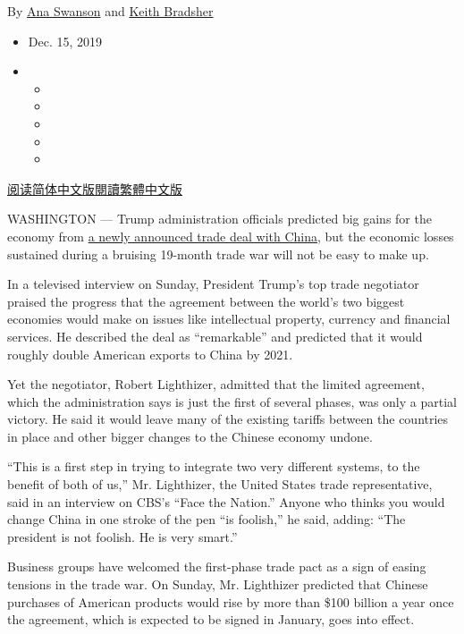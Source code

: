 By \href{https://www.nytimes.com/by/ana-swanson}{Ana Swanson} and
\href{https://www.nytimes.com/by/keith-bradsher}{Keith Bradsher}

\begin{itemize}
\item
  Dec. 15, 2019
\item
  \begin{itemize}
  \item
  \item
  \item
  \item
  \item
  \end{itemize}
\end{itemize}

\href{https://cn.nytimes.com/business/20191216/us-china-trade-deal/}{阅读简体中文版}\href{https://cn.nytimes.com/business/20191216/us-china-trade-deal/zh-hant/}{閱讀繁體中文版}

WASHINGTON --- Trump administration officials predicted big gains for
the economy from
\href{https://www.nytimes.com/2019/12/13/business/economy/china-trade-deal.html}{a
newly announced trade deal with China}, but the economic losses
sustained during a bruising 19-month trade war will not be easy to make
up.

In a televised interview on Sunday, President Trump's top trade
negotiator praised the progress that the agreement between the world's
two biggest economies would make on issues like intellectual property,
currency and financial services. He described the deal as ``remarkable''
and predicted that it would roughly double American exports to China by
2021.

Yet the negotiator, Robert Lighthizer, admitted that the limited
agreement, which the administration says is just the first of several
phases, was only a partial victory. He said it would leave many of the
existing tariffs between the countries in place and other bigger changes
to the Chinese economy undone.

``This is a first step in trying to integrate two very different
systems, to the benefit of both of us,'' Mr. Lighthizer, the United
States trade representative, said in an interview on CBS's ``Face the
Nation.'' Anyone who thinks you would change China in one stroke of the
pen ``is foolish,'' he said, adding: ``The president is not foolish. He
is very smart.''

Business groups have welcomed the first-phase trade pact as a sign of
easing tensions in the trade war. On Sunday, Mr. Lighthizer predicted
that Chinese purchases of American products would rise by more than
\$100 billion a year once the agreement, which is expected to be signed
in January, goes into effect.

